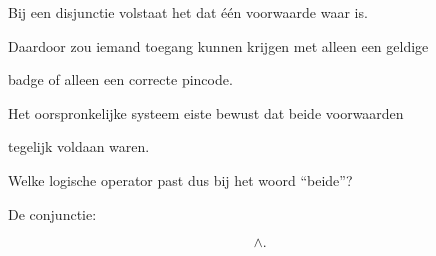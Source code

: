 \documentclass{ximera}
\begin{document}
\begin{oefening}{\oefU \ESS}
\begin{question}
\begin{oplossing}

Bij een disjunctie volstaat het dat één voorwaarde waar is.

Daardoor zou iemand toegang kunnen krijgen met alleen een geldige

badge of alleen een correcte pincode.

Het oorspronkelijke systeem eiste bewust dat beide voorwaarden

tegelijk voldaan waren.

\end{oplossing}

\end{question}



\begin{question}

Welke logische operator past dus bij het woord ``beide''?

\begin{oplossing}

De conjunctie:

\[
\land.
\]

\end{oplossing}

\end{question}

\end{oefening}
\end{document}
